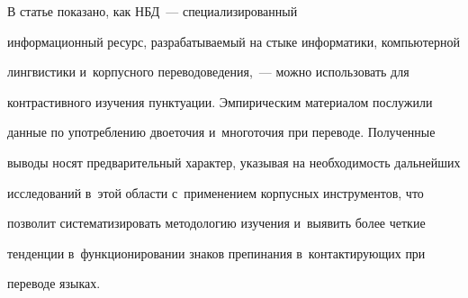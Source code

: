   


   В статье показано, как НБД~--- специализированный 


информационный ресурс, разрабатываемый на стыке информатики, компьютерной 


лингвистики и~корпусного переводоведения,~--- можно использовать для 


контрастивного изучения пунктуации. Эмпирическим материалом послужили 


данные по употреблению двоеточия и~многоточия при переводе. Полученные 


выводы носят предварительный характер, указывая на необходимость дальнейших 


исследований в~этой об\-ласти с~применением корпусных инструментов, что 


позволит систематизировать методологию изучения и~выявить более четкие 


тенденции в~функционировании знаков препинания в~контактирующих при 


переводе языках.


   


